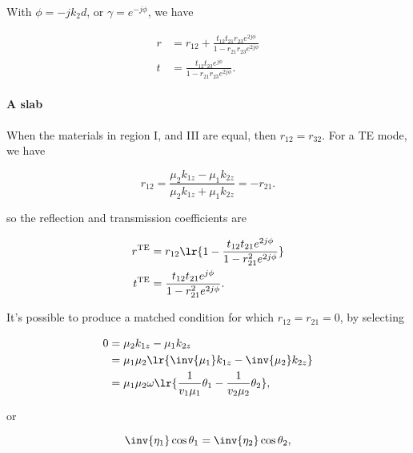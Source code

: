 With \( \phi = -j k_2 d \), or \( \gamma = e^{-j\phi} \), we have

\begin{dmath}\label{eqn:twoInterfaceNormal:180}
\boxed{
\begin{aligned}
r &= r_{12} + \frac{t_{12} t_{21} r_{23} e^{2 j \phi} }{1 - r_{21} r_{23} e^{2 j \phi}} \\
t &= \frac{ t_{12} t_{23} e^{j\phi}}{1 - r_{21} r_{23} e^{2 j \phi}}.
\end{aligned}
}
\end{dmath}

\paragraph{A slab}

When the materials in region I, and III are equal, then \( r_{12} = r_{32} \).  For a TE mode, we have

\begin{equation}\label{eqn:twoInterfaceNormal:200}
r_{12} 
= 
\frac{\mu_2 k_{1z} - \mu_1 k_{2z}}{\mu_2 k_{1z} + \mu_1 k_{2z}} 
= -r_{21}.
\end{equation}

so the reflection and transmission coefficients are

\begin{dmath}\label{eqn:twoInterfaceNormal:220}
\begin{aligned}
r^{\textrm{TE}} &= r_{12} \lr{ 1 - \frac{t_{12} t_{21} e^{2 j \phi} }{1 - r_{21}^2 e^{2 j \phi}} } \\
t^{\textrm{TE}} &= \frac{ t_{12} t_{21} e^{j\phi}}{1 - r_{21}^2 e^{2 j \phi}}.
\end{aligned}
\end{dmath}

It's possible to produce a matched condition for which \( r_{12} = r_{21} = 0 \), by selecting

\begin{dmath}\label{eqn:twoInterfaceNormal:240}
\begin{aligned}
0 
&= \mu_2 k_{1z} - \mu_1 k_{2z} \\
&= \mu_1 \mu_2 \lr{ \inv{\mu_1} k_{1z} - \inv{\mu_2} k_{2z} } \\
&= \mu_1 \mu_2 \omega \lr{ \frac{1}{v_1 \mu_1} \theta_1 - \frac{1}{v_2 \mu_2} \theta_2 },
\end{aligned}
\end{dmath}

or

\begin{dmath}\label{eqn:twoInterfaceNormal:260}
\inv{\eta_1} \cos\theta_1 = \inv{\eta_2} \cos\theta_2,
\end{dmath}

